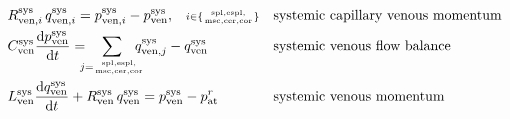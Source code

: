 \documentclass[a4paper,12pt]{report}
\begin{document}
\begin{align}
&R_{\mathrm{ven},i}^{\mathrm{sys}}\,q_{\mathrm{ven},i}^{\mathrm{sys}} = p_{\mathrm{ven},i}^{\mathrm{sys}}-p_{\mathrm{ven}}^{\mathrm{sys}}, \quad\scriptstyle{i\in\{\mathrm{spl,espl,\atop msc,cer,cor}\}} && \text{systemic capillary venous momentum}\nonumber\\
&C_{\mathrm{ven}}^{\mathrm{sys}} \frac{\mathrm{d}p_{\mathrm{ven}}^{\mathrm{sys}}}{\mathrm{d}t} = \!\!\!\!\sum_{j=\mathrm{spl,espl,\atop msc,cer,cor}}\!\!\!\!\!q_{\mathrm{ven},j}^{\mathrm{sys}}-q_{\mathrm{ven}}^{\mathrm{sys}} && \text{systemic venous flow balance}\nonumber\\
&L_{\mathrm{ven}}^{\mathrm{sys}}\frac{\mathrm{d}q_{\mathrm{ven}}^{\mathrm{sys}}}{\mathrm{d}t} + R_{\mathrm{ven}}^{\mathrm{sys}}\, q_{\mathrm{ven}}^{\mathrm{sys}} = p_{\mathrm{ven}}^{\mathrm{sys}} - p_{\mathrm{at}}^{r} && \text{systemic venous momentum}\nonumber
\end{align}
\end{document}
